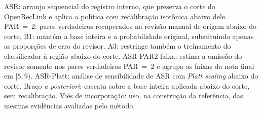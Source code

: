 \par\footnotesize ASR: arranjo sequencial do registro interno, que preserva o corte do OpenRecLink e aplica a política com recalibração isotônica abaixo dele. PAR~=~2: pares verdadeiros recuperados na revisão manual de origem abaixo do corte. B1: mantém a base inteira e a probabilidade original, substituindo apenas as proporções de erro do revisor. A3: restringe também o treinamento do classificador à região abaixo do corte. ASR-PAR2-faixa: estima a omissão do revisor somente nos pares verdadeiros PAR~=~2 e agrupa as faixas da nota final em $[5,9)$. ASR-Platt: análise de sensibilidade de ASR com \textit{Platt scaling} abaixo do corte. Braço \textit{a posteriori}: cascata sobre a base inteira aplicada abaixo do corte, sem recalibração. Viés de incorporação: uso, na construção da referência, das mesmas evidências avaliadas pelo método.

\endgroup
